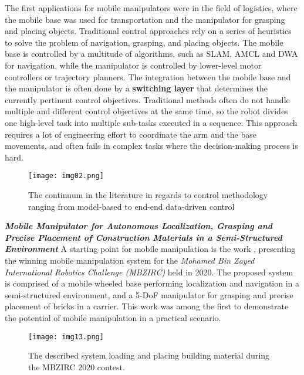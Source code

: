 The first applications for mobile manipulators were in the field of logistics, where the
mobile base was used for transportation and the manipulator for grasping and placing objects.
Traditional control approaches rely on a series of heuristics to solve the problem of
navigation, grasping, and placing objects. The mobile base is controlled by a multitude of
algorithms, such as SLAM, AMCL and DWA for navigation, while the manipulator is controlled
by lower-level motor controllers or trajectory planners. The integration between the
mobile base and the manipulator is often done by a \textbf{switching layer} that determines the
currently pertinent control objectives. Traditional methods often do not handle multiple and different
control objectives at the same time, so the robot divides one high-level task
into multiple sub-tasks executed in a sequence.
This approach requires a lot of engineering effort to coordinate the arm and the base
movements, and often fails in complex tasks where the decision-making process is hard.

\begin{figure}[ht]
	\centering
	\texttt{[image: img02.png]}
	\captionsetup{width=0.6\linewidth}
	\caption{The continuum in the literature in regards to control
		methodology ranging from model-based to end-end data-driven
		control \cite{thakar2023survey}}
	\label{fig:img02}
\end{figure}


\textbf{\textit{Mobile Manipulator for Autonomous Localization,
		Grasping and Precise Placement of Construction
		Materials in a Semi-Structured Environment}} \quad
A starting point for mobile manipulation is the work \cite{loianno2021construction},
presenting the winning mobile manipulation system for the \textit{Mohamed
	Bin Zayed International Robotics Challenge (MBZIRC)} held in 2020. The proposed system
is comprised of a mobile wheeled base performing localization and navigation in a
semi-structured environment, and a 5-DoF manipulator for grasping and precise placement
of bricks in a carrier. This work was among the first to demonstrate the potential
of mobile manipulation in a practical scenario.

\begin{figure}[ht]
	\centering
	\texttt{[image: img13.png]}
	\captionsetup{width=1\linewidth}
	\caption{The described system loading and placing building material
		during the MBZIRC 2020 contest.	\cite{loianno2021construction}}
	\label{fig:img13}
\end{figure}

